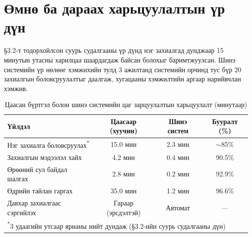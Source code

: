 \section{Өмнө ба дараах харьцуулалтын үр дүн}

§3.2-т тодорхойлсон суурь судалгааны үр дүнд нэг захиалгад дунджаар 15 минутын утасны харилцаа шаардагдаж байсан болохыг баримтжуулсан. Шинэ системийн үр нөлөөг хэмжихийн тулд 3 ажилтанд системийн орчинд тус бүр 20 захиалгын боловсруулалтыг даалгаж, хугацааны хэмжилтийн аргаар нарийвчлан хэмжив.

\begin{table}[H]
  \centering
  \caption{Цаасан бүртгэл болон шинэ системийн цаг зарцуулалтын харьцуулалт (минутаар)}
  \label{tab:before-after}
  \begin{tabular}{lccc}
    \toprule
    \textbf{Үйлдэл} & \textbf{Цаасаар (хуучин)} & \textbf{Шинэ систем} & \textbf{Бууралт (\%)} \\
    \midrule
    Нэг захиалга боловсруулах\textsuperscript{*} & 15.0 мин & 2.3 мин & $\sim$85\%  \\
    Захиалгын мэдээлэл хайх                      & 4.2 мин  & 0.4 мин & 90.5\% \\
    Өрөөний сул байдал шалгах                     & 2.8 мин  & 0.2 мин & 92.9\% \\
    Өдрийн тайлан гаргах                          & 35.0 мин & 1.2 мин & 96.6\% \\
    Давхар захиалгаас сэргийлэх & Гараар (эрсдэлтэй) & Автомат & --- \\
    \bottomrule
    \multicolumn{4}{l}{\textsuperscript{*}3 удаагийн утсаар ярианы нийт дундаж (§3.2-ийн суурь судалгааны дүн)} \\
  \end{tabular}
\end{table}

